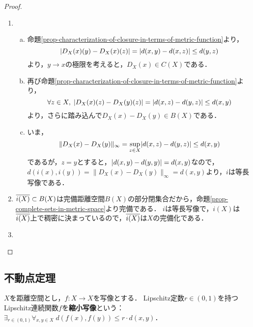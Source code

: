 \documentclass[uplatex,dvipdfmx]{jsreport}
\begin{document}
\begin{proof}\mbox{}
    \begin{enumerate}
        \item \begin{enumerate}[(a)]
            \item 命題\ref{prop-characterization-of-closure-in-terms-of-metric-function}より，
            \[\lvert D_X(x)(y)-D_X(x)(z)\rvert=\lvert d(x,y)-d(x,z)\rvert\le d(y,z)\]
            より，$y\to x$の極限を考えると，$D_X(x)\in C(X)$である．
            \item 再び命題\ref{prop-characterization-of-closure-in-terms-of-metric-function}より，
            \[\forall z\in X,\;\lvert D_X(x)(z)-D_X(y)(z)\rvert=\lvert d(x,z)-d(y,z)\rvert\le d(x,y)\]
            より，さらに踏み込んで$D_X(x)-D_X(y)\in B(X)$である．
            \item 
            いま，
            \[\|D_X(x)-D_X(y)\|_\infty=\sup_{z\in X}\lvert d(x,z)-d(y,z)\rvert\le d(x,y)\]
            であるが，$z=y$とすると，$\lvert d(x,y)-d(y,y)\rvert=d(x,y)$なので，$d(i(x),i(y))=\|D_X(x)-D_X(y)\|_\infty=d(x,y)$より，$i$は等長写像である．
        \end{enumerate}
        \item 
        $\overline{i(X)}\subset B(X)$は完備距離空間$B(X)$の部分閉集合だから，命題\ref{prop-complete-sets-in-metric-space}より完備である．
        $i$は等長写像で，$i(X)$は$\overline{i(X)}$上で稠密に決まっているので，$\overline{i(X)}$は$X$の完備化である．
        \item 

    \end{enumerate}
\end{proof}

\subsection{不動点定理}

\begin{definition}
    $X$を距離空間とし，$f:X\to X$を写像とする．
    Lipschitz定数$r\in(0,1)$を持つLipschitz連続関数$f$を\textbf{縮小写像}という：$\exists_{r\in(0,1)}\forall_{x,y\in X}\;d(f(x),f(y))\le r\cdot d(x,y)$．
\end{definition}
\end{document}
